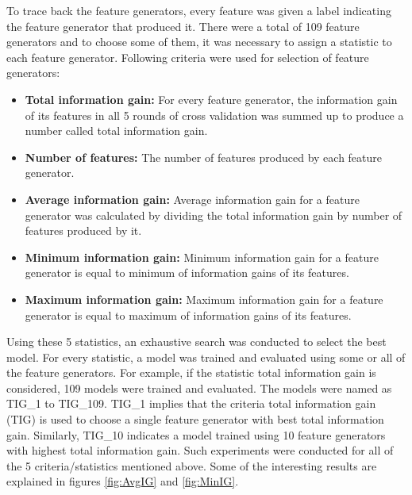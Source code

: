 To trace back the feature generators, every feature was given a label indicating the feature generator that produced it. There were a total of 109 feature generators and to choose some of them, it was necessary to assign a statistic to each feature generator. Following criteria were used for selection of feature generators:

\begin{itemize}

\item \textbf{Total information gain:} For every feature generator, the information gain of its features in all 5 rounds of cross validation was summed up to produce a number called total information gain.

\item \textbf{Number of features:} The number of features produced by each feature generator.

\item \textbf{Average information gain:} Average information gain for a feature generator was calculated by dividing the total information gain by number of features produced by it.

\item \textbf{Minimum information gain:} Minimum information gain for a feature generator is equal to minimum of information gains of its features.

\item \textbf{Maximum information gain:} Maximum information gain for a feature generator is equal to maximum of information gains of its features.

\end{itemize}

Using these 5 statistics, an exhaustive search was conducted to select the best model. For every statistic, a model was trained and evaluated using some or all of the feature generators. For example, if the statistic total information gain is considered, 109 models were trained and evaluated. The models were named as TIG\_1 to TIG\_109. TIG\_1 implies that the criteria total information gain (TIG) is used to choose a single feature generator with best total information gain. Similarly, TIG\_10 indicates a model trained using 10 feature generators with highest total information gain. Such experiments were conducted for all of the 5 criteria/statistics mentioned above. Some of the interesting results are explained in figures \ref{fig:AvgIG} and \ref{fig:MinIG}.


